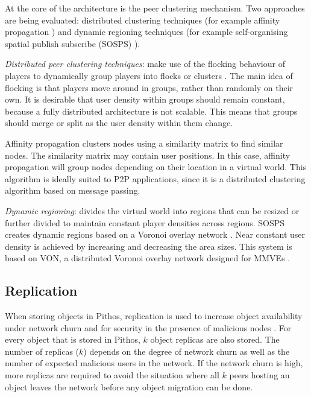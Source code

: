 At the core of the architecture is the peer clustering mechanism. Two approaches are being evaluated: distributed clustering techniques (for example
affinity propagation \cite{affinity_propagation}) and dynamic regioning techniques (for example self-organising spatial publish subscribe (SOSPS)
\cite{self_organising_sps_post}).

\emph{Distributed peer clustering techniques}: make use of the flocking behaviour of players to dynamically group players into flocks or clusters
\cite{flocking}. The main idea of flocking is that players move around in groups, rather than randomly on their own. It is desirable that user
density within groups should remain constant, because a fully distributed architecture is not scalable. This means that groups should merge or split
as the user density within them change.

Affinity propagation clusters nodes using a similarity matrix to find similar nodes. The similarity matrix may contain user positions. In this case,
affinity propagation will group nodes depending on their location in a virtual world. This algorithm is ideally suited to P2P applications, since it
is a distributed clustering algorithm based on message passing.

\emph{Dynamic regioning}: divides the virtual world into regions that can be resized or further divided to maintain constant player densities across
regions. SOSPS creates dynamic regions based on a Voronoi overlay network \cite{voronoi_diagrams_survey}. Near constant user density is achieved by
increasing and decreasing the area sizes. This system is based on VON, a distributed Voronoi overlay network designed for MMVEs \cite{VON_VAST}.

\subsection{Replication}
\label{store_retrieve}

When storing objects in Pithos, replication is used to increase object availability under network churn and for security in the presence of malicious
nodes \cite{storage_and_chaching_PAST}. For every object that is stored in Pithos, $k$ object replicas are also stored. The number of replicas ($k$)
depends on the degree of network churn as well as the number of expected malicious users in the network. If the network churn is high, more replicas
are required to avoid the situation where all $k$ peers hosting an object leaves the network before any object migration can be done.

